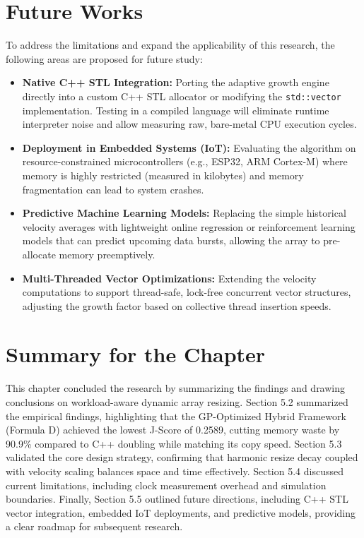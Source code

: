 \section{Future Works}
To address the limitations and expand the applicability of this research, 
the following areas are proposed for future study:
\begin{itemize}
    \item \textbf{Native C++ STL Integration:} Porting the adaptive growth 
    engine directly into a custom C++ STL allocator or modifying the 
    \texttt{std::vector} implementation. Testing in a compiled language will 
    eliminate runtime interpreter noise and allow measuring raw, bare-metal CPU 
    execution cycles.
    \item \textbf{Deployment in Embedded Systems (IoT):} Evaluating the 
    algorithm on resource-constrained microcontrollers (e.g., ESP32, ARM Cortex-M) 
    where memory is highly restricted (measured in kilobytes) and memory 
    fragmentation can lead to system crashes.
    \item \textbf{Predictive Machine Learning Models:} Replacing the simple 
    historical velocity averages with lightweight online regression or reinforcement 
    learning models that can predict upcoming data bursts, allowing the array to 
    pre-allocate memory preemptively.
    \item \textbf{Multi-Threaded Vector Optimizations:} Extending the velocity 
    computations to support thread-safe, lock-free concurrent vector structures, 
    adjusting the growth factor based on collective thread insertion speeds.
\end{itemize}

\section{Summary for the Chapter}
This chapter concluded the research by summarizing the findings and drawing 
conclusions on workload-aware dynamic array resizing. Section 5.2 summarized the 
empirical findings, highlighting that the GP-Optimized Hybrid Framework 
(Formula D) achieved the lowest J-Score of 0.2589, cutting memory waste 
by 90.9\% compared to C++ doubling while matching its copy speed. Section 5.3 
validated the core design strategy, confirming that harmonic resize decay 
coupled with velocity scaling balances space and time effectively. Section 5.4 
discussed current limitations, including clock measurement overhead and simulation 
boundaries. Finally, Section 5.5 outlined future directions, including C++ STL 
vector integration, embedded IoT deployments, and predictive models, providing 
a clear roadmap for subsequent research.
